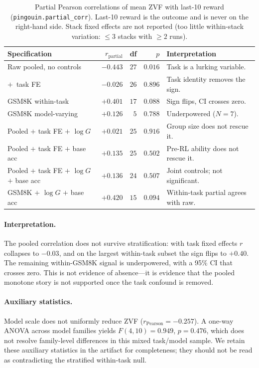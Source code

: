 \documentclass{article}
\begin{document}
\begin{table}[h]
\centering\small
\begin{tabular}{lrrrl}
\toprule
Specification & $r_{\text{partial}}$ & df & $p$ & Interpretation \\
\midrule
Raw pooled, no controls                          & $-0.443$ & $27$ & $0.016$ & Task is a lurking variable. \\
$+$~task FE                                      & $-0.026$ & $26$ & $0.896$ & Task identity removes the sign. \\
GSM8K within-task                                & $+0.401$ & $17$ & $0.088$ & Sign flips, CI crosses zero. \\
GSM8K model-varying                              & $+0.126$ & $5$  & $0.788$ & Underpowered ($N{=}7$). \\
Pooled $+$ task FE $+$ $\log G$                  & $+0.021$ & $25$ & $0.916$ & Group size does not rescue it. \\
Pooled $+$ task FE $+$ base acc                  & $+0.135$ & $25$ & $0.502$ & Pre-RL ability does not rescue it. \\
Pooled $+$ task FE $+$ $\log G$ $+$ base acc     & $+0.136$ & $24$ & $0.507$ & Joint controls; not significant. \\
GSM8K $+$ $\log G$ $+$ base acc                  & $+0.420$ & $15$ & $0.094$ & Within-task partial agrees with raw. \\
\bottomrule
\end{tabular}
\caption{Partial Pearson correlations of mean ZVF with last-10 reward
(\texttt{pingouin.partial\_corr}). Last-10 reward is the outcome and is never
on the right-hand side. Stack fixed effects are not reported (too little
within-stack variation: $\le 3$ stacks with $\ge 2$ runs).}
\label{tab:zvf-partials}
\end{table}

\paragraph{Interpretation.}
The pooled correlation does not survive stratification: with task fixed
effects $r$ collapses to $-0.03$, and on the largest within-task subset the
sign flips to $+0.40$. The remaining within-GSM8K signal is underpowered,
with a 95\% CI that crosses zero. This is not evidence of absence---it is
evidence that the pooled monotone story is not supported once the task
confound is removed.
 
\paragraph{Auxiliary statistics.}
Model scale does not uniformly reduce ZVF
($r_\text{Pearson} = -0.257$). A one-way ANOVA across model families
yields $F(4,10) = 0.949$, $p = 0.476$, which does not resolve family-level
differences in this mixed task/model sample. We retain these auxiliary
statistics in the artifact for completeness; they should not be read as
contradicting the stratified within-task null.
\end{document}
